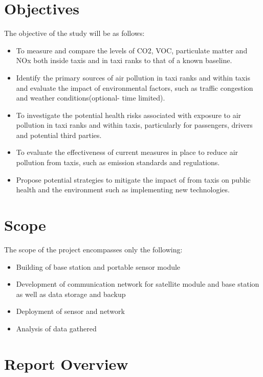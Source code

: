 \section{Objectives}
The objective of the study will be as follows:
\begin{itemize}
	\item To measure and compare the levels of CO2, VOC, particulate matter and NOx both inside taxis and in taxi ranks to that of a known baseline.
	\item Identify the primary sources of air pollution in taxi ranks and within taxis and evaluate the impact of environmental factors, such as traffic congestion and weather conditions(optional- time limited).
	\item To investigate the potential health risks associated with exposure to air pollution in taxi ranks and within taxis, particularly for passengers, drivers and potential third parties.
	\item To evaluate the effectiveness of current measures in place to reduce air pollution from taxis, such as emission standards and regulations.
	\item Propose potential strategies to mitigate the impact of  from taxis on public health and the environment such as implementing new technologies.
\end{itemize}




\section{Scope}
The scope of the project encompasses only the following:

\begin{itemize}
	\item Building of base station and portable sensor module
	\item Development of communication network for satellite module and base station as well as data storage and backup
	\item Deployment of sensor and network
	\item Analysis of data gathered
\end{itemize}

\section{Report Overview}%



